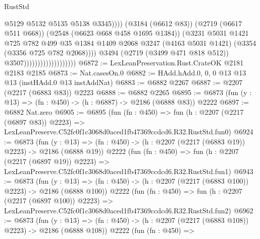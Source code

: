 \begin{lexlean}{RustStd}
\begin{coremodule}
                                                    @5129
                                                    @5132
                                                    @5135
                                                    @5138
                                                    @3345))))
                                            (@3184 (@6612 @83))
                                            (@2719 (@6617 @511 @668))
                                            (@2548 (@6623 @668 @458 @1695 @1384))
                                            (@3231
                                              @5031
                                              @1421
                                              @725
                                              @782
                                              @499
                                              @35
                                              @1384
                                              @1409
                                              @2068
                                              @3247
                                              (@4163 @5031 @1421)
                                              (@3354 (@3356 @725 @782 @2068))))
                                          @3494
                                          (@2719 (@3499 @471 @818 @512))
                                          @3507)))))))))))))))))))
@6872 := LexLeanPreservation.Rust.CrateOK @2181 @2183 @2185
@6873 := Nat.casesOn.{0}
@6882 := HAdd.hAdd.{0, 0, 0} @13 @13 @13 (instHAdd.{0} @13 instAddNat)
@6883 := @6882 @2267
@6887 := @2207 (@2217 (@6883 @83)) @2223
@6888 := @6882 @2265
@6895 := @6873 (fun (y : @13) => (fn : @450) -> (h : @6887) -> @2186 (@6888 @83)) @2222
@6897 := @6882 Nat.zero
@6905 := @6895
    (fun (fn : @450) =>
    fun (h : @2207 (@2217 (@6897 @83)) @2223) =>
    LexLeanPreserve.C52fc0f1c3068d0aced1fb47369ccdcd6.R32.RustStd.fun0)
@6924 := @6873
    (fun (y : @13) => (fn : @450) -> (h : @2207 (@2217 (@6883 @19)) @2223) -> @2186 (@6888 @19))
    @2222
    (fun (fn : @450) =>
    fun (h : @2207 (@2217 (@6897 @19)) @2223) =>
    LexLeanPreserve.C52fc0f1c3068d0aced1fb47369ccdcd6.R32.RustStd.fun1)
@6943 := @6873
    (fun (y : @13) => (fn : @450) -> (h : @2207 (@2217 (@6883 @100)) @2223) -> @2186 (@6888 @100))
    @2222
    (fun (fn : @450) =>
    fun (h : @2207 (@2217 (@6897 @100)) @2223) =>
    LexLeanPreserve.C52fc0f1c3068d0aced1fb47369ccdcd6.R32.RustStd.fun2)
@6962 := @6873
    (fun (y : @13) => (fn : @450) -> (h : @2207 (@2217 (@6883 @108)) @2223) -> @2186 (@6888 @108))
    @2222
    (fun (fn : @450) =>

\end{coremodule}
\end{lexlean}
